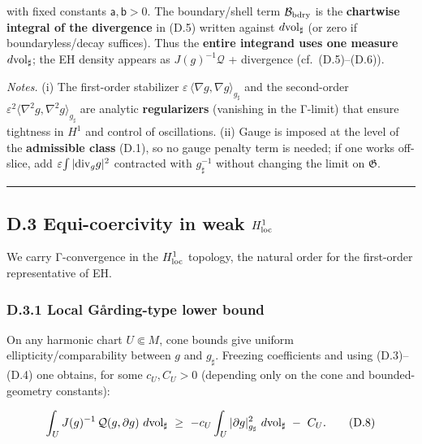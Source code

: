 \documentclass[
]{article}
\numberwithin{equation}{section}
\begin{document}
with fixed constants \(\mathsf a,\mathsf b>0\). The boundary/shell term
\(\mathcal B_{\rm bdry}\) is the \textbf{chartwise integral of the
divergence} in (D.5) written against \(d{\rm vol}_\sharp\) (or zero if
boundaryless/decay suffices). Thus the \textbf{entire integrand uses one
measure} \(d{\rm vol}_\sharp\); the EH density appears as
\(J(g)^{-1}\mathcal Q\) + divergence (cf.~(D.5)--(D.6)).

\emph{Notes.} (i) The first-order stabilizer
\(\varepsilon\,\langle\nabla g,\nabla g\rangle_{g_\sharp}\) and the
second-order
\(\varepsilon^2\langle\nabla^2 g,\nabla^2 g\rangle_{g_\sharp}\) are
analytic \textbf{regularizers} (vanishing in the Γ-limit) that ensure
tightness in \(H^1\) and control of oscillations. (ii) Gauge is imposed
at the level of the \textbf{admissible class} (D.1), so no gauge penalty
term is needed; if one works off-slice, add
\(\varepsilon\!\int |{\rm div}_g g|^2\) contracted with
\(g_\sharp^{-1}\) without changing the limit on \(\mathfrak G\).

\begin{center}\rule{0.5\linewidth}{0.5pt}\end{center}

\hypertarget{d.3-equi-coercivity-in-weak-h1_rm-loc}{%
\subsection{\texorpdfstring{D.3 Equi-coercivity in \textbf{weak
\(H^1_{\rm loc}\)}}{D.3 Equi-coercivity in weak H\^{}1\_\{\textbackslash rm loc\}}}\label{d.3-equi-coercivity-in-weak-h1_rm-loc}}

We carry Γ-convergence in the \textbf{\(H^1_{\rm loc}\)} topology, the
natural order for the first-order representative of EH.

\hypertarget{d.3.1-local-guxe5rding-type-lower-bound}{%
\subsubsection{D.3.1 Local Gårding-type lower
bound}\label{d.3.1-local-guxe5rding-type-lower-bound}}

On any harmonic chart \(U\Subset M\), cone bounds give uniform
ellipticity/comparability between \(g\) and \(g_\sharp\). Freezing
coefficients and using (D.3)--(D.4) one obtains, for some \(c_U,C_U>0\)
(depending only on the cone and bounded-geometry constants):

\[
\int_U J(g)^{-1}\,\mathcal Q(g,\partial g)\ d{\rm vol}_\sharp
\ \ge\
-c_U\int_U |\partial g|^2_{g_\sharp}\ d{\rm vol}_\sharp
\ -\ C_U.
\tag{D.8}
\]
\end{document}
